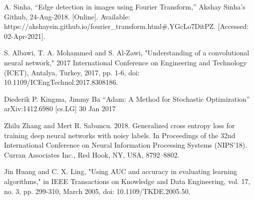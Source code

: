 \documentclass[conference]{IEEEtran}
\begin{document}
\begin{thebibliography}{00}
A. Sinha, “Edge detection in images using Fourier Transform,” Akshay Sinha's Github, 24-Aug-2018. [Online]. Available: https://akshaysin.github.io/fourier\_transform.html\#.YGcLo7DitPZ. [Accessed: 02-Apr-2021]. 

S. Albawi, T. A. Mohammed and S. Al-Zawi, "Understanding of a convolutional neural network," 2017 International Conference on Engineering and Technology (ICET), Antalya, Turkey, 2017, pp. 1-6, doi: 10.1109/ICEngTechnol.2017.8308186.

Diederik P. Kingma, Jimmy Ba “Adam: A Method for Stochastic Optimization” arXiv:1412.6980 [cs.LG] 30 Jan 2017

Zhilu Zhang and Mert R. Sabuncu. 2018. Generalized cross entropy loss for training deep neural networks with noisy labels. In Proceedings of the 32nd International Conference on Neural Information Processing Systems (NIPS'18). Curran Associates Inc., Red Hook, NY, USA, 8792–8802.

Jin Huang and C. X. Ling, "Using AUC and accuracy in evaluating learning algorithms," in IEEE Transactions on Knowledge and Data Engineering, vol. 17, no. 3, pp. 299-310, March 2005, doi: 10.1109/TKDE.2005.50.



\end{thebibliography}
\end{document}
